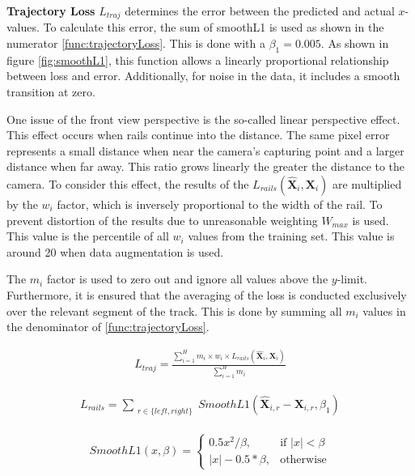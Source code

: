 \textbf{Trajectory Loss} $L_{traj}$ determines the error between the predicted and actual $x$-values.
To calculate this error, the sum of smoothL1 is used as shown in the numerator \autoref{func:trajectoryLoss}.
This is done with a $\beta_{1} = 0.005$. As shown in figure \autoref{fig:smoothL1}, this function allows a linearly proportional relationship between loss and error.
Additionally, for noise in the data, it includes a smooth transition at zero.

One issue of the front view perspective is the so-called linear perspective effect.
This effect occurs when rails continue into the distance.
The same pixel error represents a small distance when near the camera's capturing point and a larger distance when far away.
This ratio grows linearly the greater the distance to the camera.
To consider this effect, the results of the $L_{rails}(\hat{\mathbf{X}}_{i},\mathbf{X}_{i})$ are multiplied by the $w_{i}$ factor, which is inversely proportional to the width of the rail.
To prevent distortion of the results due to unreasonable weighting $W_{max}$ is used.
This value is the %
percentile of all $w_{i}$ values from the training set.
This value is around 20 when data augmentation is used.

The $m_{i}$ factor is used to zero out and ignore all values above the $y$-limit.
Furthermore, it is ensured that the averaging of the loss is conducted exclusively over the relevant segment of the track.
This is done by summing all $m_{i}$ values in the denominator of \autoref{func:trajectoryLoss}.

\begin{align}
    L_{traj} = \frac{\sum_{i=1}^H m_{i} \times w_{i} \times L_{rails}(\hat{\mathbf{X}}_{i},\mathbf{X}_{i})}
    {\sum_{i=1}^H m_{i}}
    \label{func:trajectoryLoss}
\end{align}

\begin{align}
    L_{rails} = \sum_{\substack{r \in \{left, right\}}} SmoothL1(\hat{\mathbf{X}}_{i,r} - \mathbf{X}_{i,r}, \beta_1)
    \label{func:smoothL1_error}
\end{align}

\begin{align}
    SmoothL1(x, \beta) = 
    \begin{cases}
        0.5 x^2 / \beta, & \text{if } |x| < \beta \\
        |x| - 0.5 * \beta, & \text{otherwise}
    \end{cases}
    \label{func:smoothL1}
\end{align}

